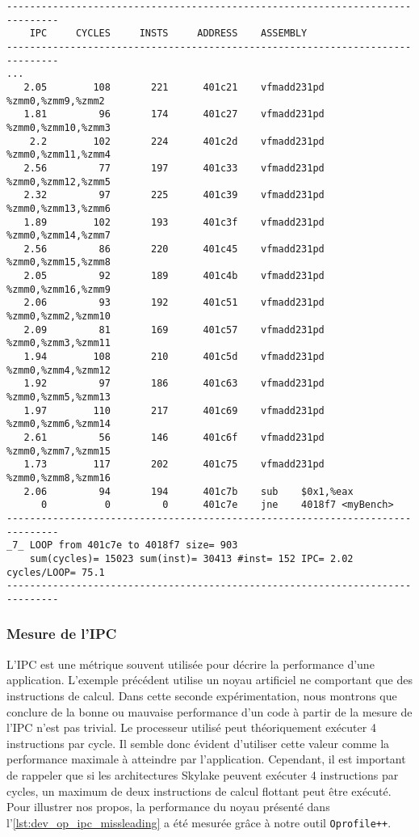  \begin{lstlisting}[label=lst:dev_op_dependance_8_streams, caption=L'optimisation du noyau précèdent permet de présenter au processeur 8 chaînes de calcul indépendantes.]
-------------------------------------------------------------------------------
    IPC     CYCLES     INSTS     ADDRESS    ASSEMBLY                         
-------------------------------------------------------------------------------
...
   2.05        108       221      401c21    vfmadd231pd %zmm0,%zmm9,%zmm2
   1.81         96       174      401c27    vfmadd231pd %zmm0,%zmm10,%zmm3
    2.2        102       224      401c2d    vfmadd231pd %zmm0,%zmm11,%zmm4
   2.56         77       197      401c33    vfmadd231pd %zmm0,%zmm12,%zmm5
   2.32         97       225      401c39    vfmadd231pd %zmm0,%zmm13,%zmm6
   1.89        102       193      401c3f    vfmadd231pd %zmm0,%zmm14,%zmm7
   2.56         86       220      401c45    vfmadd231pd %zmm0,%zmm15,%zmm8
   2.05         92       189      401c4b    vfmadd231pd %zmm0,%zmm16,%zmm9
   2.06         93       192      401c51    vfmadd231pd %zmm0,%zmm2,%zmm10
   2.09         81       169      401c57    vfmadd231pd %zmm0,%zmm3,%zmm11
   1.94        108       210      401c5d    vfmadd231pd %zmm0,%zmm4,%zmm12
   1.92         97       186      401c63    vfmadd231pd %zmm0,%zmm5,%zmm13
   1.97        110       217      401c69    vfmadd231pd %zmm0,%zmm6,%zmm14
   2.61         56       146      401c6f    vfmadd231pd %zmm0,%zmm7,%zmm15
   1.73        117       202      401c75    vfmadd231pd %zmm0,%zmm8,%zmm16
   2.06         94       194      401c7b    sub    $0x1,%eax
      0          0         0      401c7e    jne    4018f7 <myBench>
-------------------------------------------------------------------------------
_7_ LOOP from 401c7e to 4018f7 size= 903 
    sum(cycles)= 15023 sum(inst)= 30413 #inst= 152 IPC= 2.02 cycles/LOOP= 75.1
-------------------------------------------------------------------------------

\end{lstlisting}   




    \subsubsection{Mesure de l'IPC}
    
        L'IPC est une métrique souvent utilisée pour décrire la performance d'une application. L'exemple précédent utilise un noyau artificiel ne comportant que des instructions de calcul. Dans cette seconde expérimentation, nous montrons que conclure de la bonne ou mauvaise performance d'un code à partir de la mesure de l'IPC n'est pas trivial. Le processeur utilisé peut théoriquement exécuter 4 instructions par cycle. Il semble donc évident d'utiliser cette valeur comme la performance maximale à atteindre par l'application. Cependant, il est important de rappeler que si les architectures Skylake peuvent exécuter 4 instructions par cycles, un maximum de deux instructions de calcul flottant peut être exécuté. Pour illustrer nos propos, la performance du noyau présenté dans l'\autoref{lst:dev_op_ipc_missleading} a été mesurée grâce à notre outil \verb=Oprofile++=.

